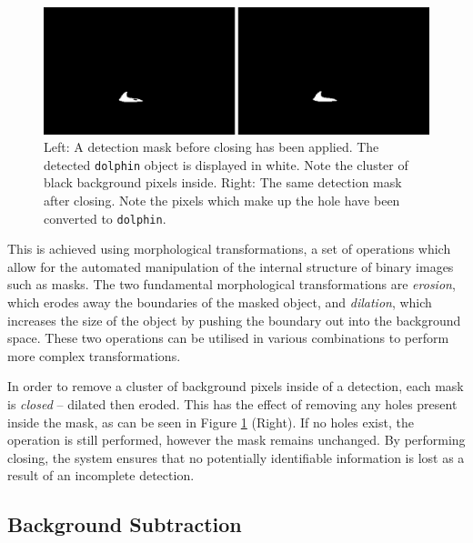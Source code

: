 \begin{figure}
	\begin{center}
		\includegraphics[scale=0.5]{Chapter3/figs/before-and-after-morphing-masks-only.png}
	\end{center}
	\caption[Left: A detection mask before closing has been applied. Right: The same detection mask after closing.]{Left: A detection mask before closing has been applied. The detected \texttt{dolphin} object is displayed in white. Note the cluster of black background pixels inside. Right: The same detection mask after closing. Note the pixels which make up the hole have been converted to \texttt{dolphin}.}
	\label{fig:before-and-after-morphing-masks-only}
\end{figure}

This is achieved using morphological transformations, a set of operations which allow for the automated manipulation of the internal structure of binary images such as masks. The two fundamental morphological transformations are \textit{erosion}, which erodes away the boundaries of the masked object, and \textit{dilation}, which increases the size of the object by pushing the boundary out into the background space. These two operations can be utilised in various combinations to perform more complex transformations.

In order to remove a cluster of background pixels inside of a detection, each mask is \textit{closed} -- dilated then eroded. This has the effect of removing any holes present inside the mask, as can be seen in Figure \ref{fig:before-and-after-morphing-masks-only} (Right). If no holes exist, the operation is still performed, however the mask remains unchanged. By performing closing, the system ensures that no potentially identifiable information is lost as a result of an incomplete detection. 

\subsection{Background Subtraction}\label{ch:cetDet,sec:postProcessing,sub:bgExtraction}

